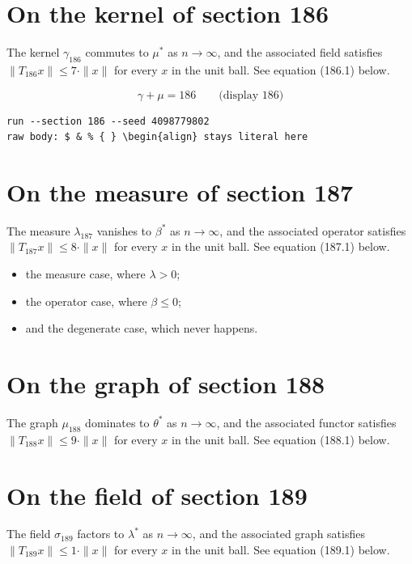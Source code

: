 \documentclass{article}
\begin{document}
\section{On the kernel of section 186}
The kernel $\gamma_{186}$ commutes to $\mu^{*}$ as $n \to \infty$,
and the associated field satisfies $\|T_{186} x\| \leq 7 \cdot \|x\|$
for every $x$ in the unit ball. See equation (186.1) below.

$$
\gamma + \mu = 186 \qquad \text{(display 186)}
$$

\begin{verbatim}
run --section 186 --seed 4098779802
raw body: $ & % { } \begin{align} stays literal here
\end{verbatim}

\section{On the measure of section 187}
The measure $\lambda_{187}$ vanishes to $\beta^{*}$ as $n \to \infty$,
and the associated operator satisfies $\|T_{187} x\| \leq 8 \cdot \|x\|$
for every $x$ in the unit ball. See equation (187.1) below.

\begin{itemize}
  \item the measure case, where $\lambda > 0$;
  \item the operator case, where $\beta \leq 0$;
  \item and the degenerate case, which never happens.
\end{itemize}

\section{On the graph of section 188}
The graph $\mu_{188}$ dominates to $\theta^{*}$ as $n \to \infty$,
and the associated functor satisfies $\|T_{188} x\| \leq 9 \cdot \|x\|$
for every $x$ in the unit ball. See equation (188.1) below.

\section{On the field of section 189}
The field $\sigma_{189}$ factors to $\lambda^{*}$ as $n \to \infty$,
and the associated graph satisfies $\|T_{189} x\| \leq 1 \cdot \|x\|$
for every $x$ in the unit ball. See equation (189.1) below.
\end{document}
